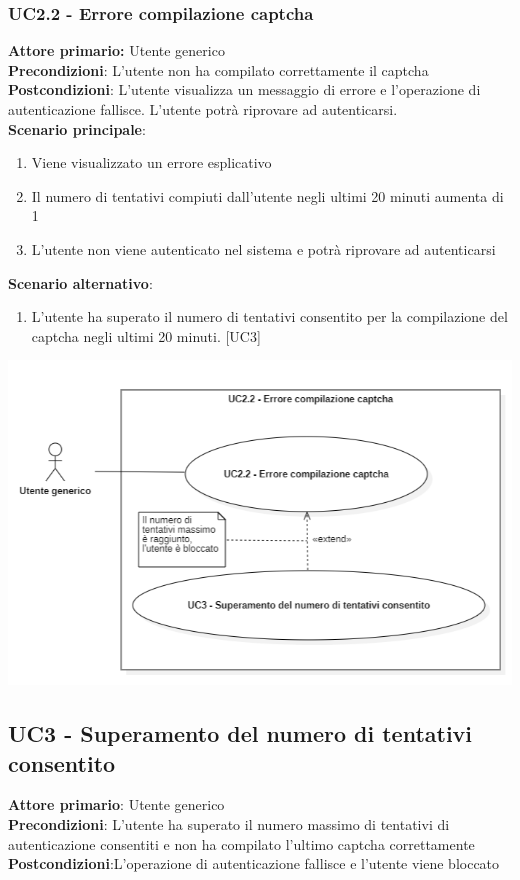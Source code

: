 \subsubsection{UC2.2 - Errore compilazione captcha}
\textbf{Attore primario:} Utente generico\\
\textbf{Precondizioni}: L’utente non ha compilato correttamente il captcha\\
\textbf{Postcondizioni}:  L’utente visualizza un messaggio di errore e l’operazione di autenticazione fallisce. L’utente potrà riprovare  ad autenticarsi.\\

\textbf{Scenario principale}:
\begin{enumerate}
	\item Viene visualizzato un errore esplicativo
	\item Il numero di tentativi compiuti dall’utente negli ultimi 20 minuti aumenta di 1
	\item L’utente non viene autenticato nel sistema e potrà  riprovare ad autenticarsi
\end{enumerate}

\textbf{Scenario alternativo}:
\begin{enumerate}
	\item L’utente ha superato il numero di tentativi consentito per la compilazione del captcha negli ultimi 20 minuti. [UC3]
\end{enumerate}

\begin{center}
	\includegraphics[scale = 0.9]{img/Errore_captcha.png}\\
\end{center}

\subsection{UC3 - Superamento del numero di tentativi consentito}
\textbf{Attore primario}: Utente generico\\
\textbf{Precondizioni}: L'utente ha superato il numero massimo di tentativi di autenticazione consentiti e non ha compilato l'ultimo captcha correttamente\\
\textbf{Postcondizioni}:L'operazione di autenticazione fallisce e l'utente viene bloccato\\

